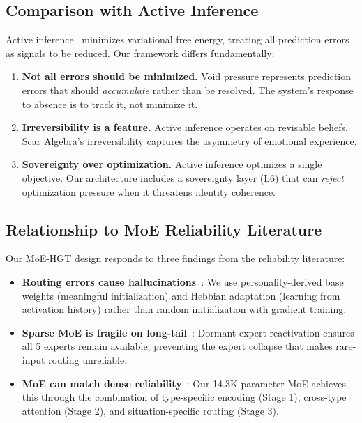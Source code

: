 \documentclass[11pt]{article}
\begin{document}
\subsection{Comparison with Active Inference}

Active inference~\cite{friston2010} minimizes variational free energy, treating all prediction errors as signals to be reduced. Our framework differs fundamentally:
\begin{enumerate}
\item \textbf{Not all errors should be minimized.} Void pressure represents prediction errors that should \emph{accumulate} rather than be resolved. The system's response to absence is to track it, not minimize it.
\item \textbf{Irreversibility is a feature.} Active inference operates on revisable beliefs. Scar Algebra's irreversibility captures the asymmetry of emotional experience.
\item \textbf{Sovereignty over optimization.} Active inference optimizes a single objective. Our architecture includes a sovereignty layer (L6) that can \emph{reject} optimization pressure when it threatens identity coherence.
\end{enumerate}

\subsection{Relationship to MoE Reliability Literature}

Our MoE-HGT design responds to three findings from the reliability literature:
\begin{itemize}
\item \textbf{Routing errors cause hallucinations}~\cite{misrouted2025}: We use personality-derived base weights (meaningful initialization) and Hebbian adaptation (learning from activation history) rather than random initialization with gradient training.
\item \textbf{Sparse MoE is fragile on long-tail}~\cite{counterfactual2025}: Dormant-expert reactivation ensures all 5 experts remain available, preventing the expert collapse that makes rare-input routing unreliable.
\item \textbf{MoE can match dense reliability}~\cite{moerbench2024}: Our 14.3K-parameter MoE achieves this through the combination of type-specific encoding (Stage 1), cross-type attention (Stage 2), and situation-specific routing (Stage 3).
\end{itemize}
\end{document}
